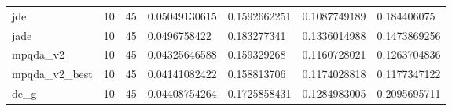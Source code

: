\begin{table}[t]
\begin{tabular}{lllllll}
jde & 10 & 45 & 0.05049130615 & 0.1592662251 & 0.1087749189 & 0.184406075 \\
jade & 10 & 45 & 0.0496758422 & 0.183277341 & 0.1336014988 & 0.1473869256 \\
mpqda\_v2 & 10 & 45 & 0.04325646588 & 0.159329268 & 0.1160728021 & 0.1263704836 \\
mpqda\_v2\_best & 10 & 45 & 0.04141082422 & 0.158813706 & 0.1174028818 & 0.1177347122 \\
de\_g & 10 & 45 & 0.04408754264 & 0.1725858431 & 0.1284983005 & 0.2095695711 \\
\hline
\end{tabular}
\end{table}
